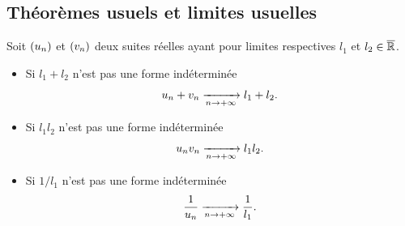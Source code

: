 \documentclass{magnoliaold}
\begin{document}

\subsection{Théorèmes usuels et limites usuelles}

\begin{proposition}[utile=-3]
Soit $\left(u_n\right)$ et $\left(v_n\right)$ deux suites réelles ayant pour limites respectives
$l_1$ et $l_2\in\overline{\mathbb{R}}$.
\begin{itemize}
\item Si $l_1+l_2$ n'est pas une forme indéterminée
  \[u_n + v_n \xrightarrow[n\rightarrow +\infty]{} l_1+l_2.\]
\item Si $l_1 l_2$ n'est pas une forme indéterminée
  \[u_n v_n \xrightarrow[n\rightarrow +\infty]{} l_1 l_2.\]
\item Si $1/l_1$ n'est pas une forme indéterminée
  \[\frac{1}{u_n} \xrightarrow[n\rightarrow +\infty]{} \frac{1}{l_1}.\]
\end{itemize}
\end{proposition}
\end{document}
